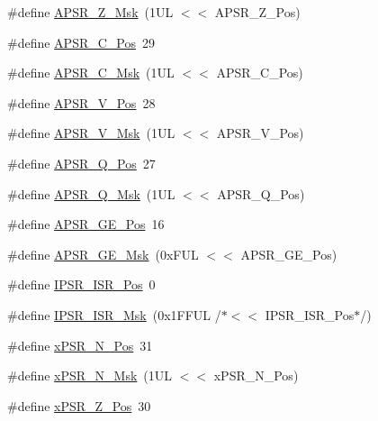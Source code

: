 \begin{DoxyCompactItemize}
\item 
\#define \hyperlink{group__CMSIS__CORE_ga1deb4d1aa72bb83d1f79329406f15711}{A\+P\+S\+R\+\_\+\+Z\+\_\+\+Msk}~(1\+U\+L $<$$<$ A\+P\+S\+R\+\_\+\+Z\+\_\+\+Pos)
\item 
\#define \hyperlink{group__CMSIS__CORE_ga6cf72aa6f09a168f9e5beda1a4a887b9}{A\+P\+S\+R\+\_\+\+C\+\_\+\+Pos}~29
\item 
\#define \hyperlink{group__CMSIS__CORE_ga6d47803fbad455bc10bd1ce59f2f335d}{A\+P\+S\+R\+\_\+\+C\+\_\+\+Msk}~(1\+U\+L $<$$<$ A\+P\+S\+R\+\_\+\+C\+\_\+\+Pos)
\item 
\#define \hyperlink{group__CMSIS__CORE_gac62830f67679ccd11658c4172c3e6ea7}{A\+P\+S\+R\+\_\+\+V\+\_\+\+Pos}~28
\item 
\#define \hyperlink{group__CMSIS__CORE_ga33305d6701356bff6890b315fe8b5489}{A\+P\+S\+R\+\_\+\+V\+\_\+\+Msk}~(1\+U\+L $<$$<$ A\+P\+S\+R\+\_\+\+V\+\_\+\+Pos)
\item 
\#define \hyperlink{group__CMSIS__CORE_ga298749e176f12827328bb7b92a6b2411}{A\+P\+S\+R\+\_\+\+Q\+\_\+\+Pos}~27
\item 
\#define \hyperlink{group__CMSIS__CORE_ga90ffd4ec4149c2f5dd7747c1533fb002}{A\+P\+S\+R\+\_\+\+Q\+\_\+\+Msk}~(1\+U\+L $<$$<$ A\+P\+S\+R\+\_\+\+Q\+\_\+\+Pos)
\item 
\#define \hyperlink{group__CMSIS__CORE_ga722cb42b5c75af3e8909fac6fd40dfdc}{A\+P\+S\+R\+\_\+\+G\+E\+\_\+\+Pos}~16
\item 
\#define \hyperlink{group__CMSIS__CORE_ga8a3ecbc0ea2029462b0f4ce50e227db1}{A\+P\+S\+R\+\_\+\+G\+E\+\_\+\+Msk}~(0x\+F\+U\+L $<$$<$ A\+P\+S\+R\+\_\+\+G\+E\+\_\+\+Pos)
\item 
\#define \hyperlink{group__CMSIS__CORE_ga0e34027584d02c43811ae908a5ca9adf}{I\+P\+S\+R\+\_\+\+I\+S\+R\+\_\+\+Pos}~0
\item 
\#define \hyperlink{group__CMSIS__CORE_gaf013a4579a64d1f21f56ea9f1b33ab56}{I\+P\+S\+R\+\_\+\+I\+S\+R\+\_\+\+Msk}~(0x1\+F\+F\+U\+L /$\ast$$<$$<$ I\+P\+S\+R\+\_\+\+I\+S\+R\+\_\+\+Pos$\ast$/)
\item 
\#define \hyperlink{group__CMSIS__CORE_ga031eb1b8ebcdb3d602d0b9f2ec82a7ae}{x\+P\+S\+R\+\_\+\+N\+\_\+\+Pos}~31
\item 
\#define \hyperlink{group__CMSIS__CORE_gaf600f4ff41b62cf2f3b0a59b6d2e93d6}{x\+P\+S\+R\+\_\+\+N\+\_\+\+Msk}~(1\+U\+L $<$$<$ x\+P\+S\+R\+\_\+\+N\+\_\+\+Pos)
\item 
\#define \hyperlink{group__CMSIS__CORE_ga5869dd608eea73c80f0567d781d2230b}{x\+P\+S\+R\+\_\+\+Z\+\_\+\+Pos}~30
\item 

\end{DoxyCompactItemize}
